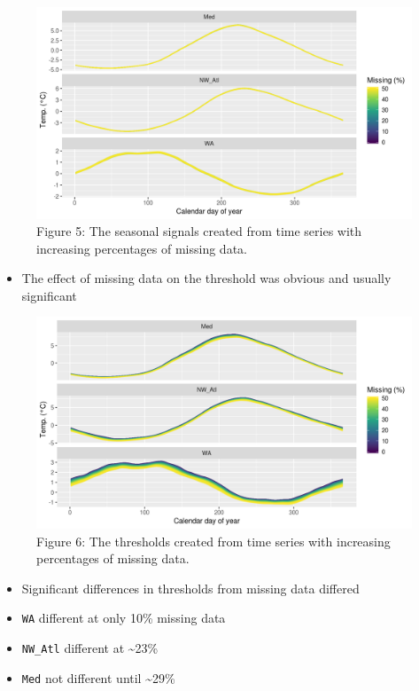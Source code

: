 \documentclass[]{article}
\providecommand{\tightlist}{%
  \setlength{\itemsep}{0pt}\setlength{\parskip}{0pt}}
\begin{document}
\begin{figure}
\centering
\includegraphics{../docs/articles/missing_data_files/figure-html/clim-miss-seas-1.png}
\caption{Figure 5: The seasonal signals created from time series with
increasing percentages of missing data.}
\end{figure}

\begin{itemize}
\tightlist
\item
  The effect of missing data on the threshold was obvious and usually
  significant
\end{itemize}

\begin{figure}
\centering
\includegraphics{../docs/articles/missing_data_files/figure-html/clim-miss-thresh-1.png}
\caption{Figure 6: The thresholds created from time series with
increasing percentages of missing data.}
\end{figure}

\begin{itemize}
\tightlist
\item
  Significant differences in thresholds from missing data differed
\item
  \texttt{WA} different at only 10\% missing data
\item
  \texttt{NW\_Atl} different at \textasciitilde{}23\%
\item
  \texttt{Med} not different until \textasciitilde{}29\%
\end{itemize}
\end{document}
